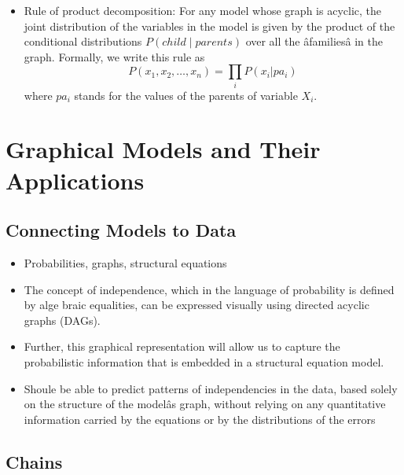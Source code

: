 \documentclass[]{article}
\providecommand{\tightlist}{%
  \setlength{\itemsep}{0pt}\setlength{\parskip}{0pt}}
\begin{document}
\begin{itemize}
\tightlist
\item
  Rule of product decomposition: For any model whose graph is acyclic,
  the joint distribution of the variables in the model is given by the
  product of the conditional distributions \(P(child \mid parents)\)
  over all the âfamiliesâ in the graph. Formally, we write this rule
  as \[
  P(x_1, x_2, \ldots , x_n) = \prod_i P(x_i | pa_i)
  \] where \(pa_i\) stands for the values of the parents of variable
  \(X_i\).
\end{itemize}

\section{Graphical Models and Their
Applications}\label{graphical-models-and-their-applications}

\subsection{Connecting Models to Data}\label{connecting-models-to-data}

\begin{itemize}
\item
  Probabilities, graphs, structural equations
\item
  The concept of independence, which in the language of probability is
  defined by alge braic equalities, can be expressed visually using
  directed acyclic graphs (DAGs).
\item
  Further, this graphical representation will allow us to capture the
  probabilistic information that is embedded in a structural equation
  model.
\item
  Shoule be able to predict patterns of independencies in the data,
  based solely on the structure of the modelâs graph, without relying
  on any quantitative information carried by the equations or by the
  distributions of the errors
\end{itemize}

\subsection{Chains}\label{chains}
\end{document}
